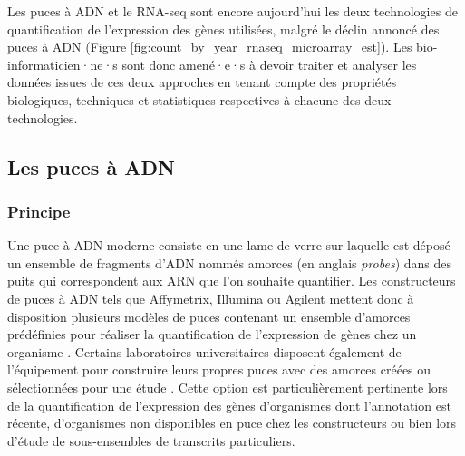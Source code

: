 Les puces à ADN et le RNA-seq sont encore aujourd'hui les deux technologies de quantification de l'expression des gènes utilisées, malgré le déclin annoncé des puces à ADN (Figure \ref{fig:count_by_year_rnaseq_microarray_est}). Les bio-informaticien·ne·s sont donc amené·e·s à devoir traiter et analyser les données issues de ces deux approches en tenant compte des propriétés biologiques, techniques et statistiques respectives à chacune des deux technologies.




\subsection{Les puces à ADN}

\subsubsection{Principe}


Une puce à ADN moderne consiste en une lame de verre sur laquelle est déposé un ensemble de fragments d'ADN nommés amorces (en anglais \textit{probes}) dans des puits qui correspondent aux ARN que l'on souhaite quantifier. Les constructeurs de puces à ADN tels que Affymetrix, Illumina ou Agilent mettent donc à disposition plusieurs modèles de puces contenant un ensemble d'amorces prédéfinies pour réaliser la quantification de l'expression de gènes chez un organisme \cite{Liu2010}. Certains laboratoires universitaires disposent également de l'équipement pour construire leurs propres puces avec des amorces créées ou sélectionnées pour une étude \cite{Thompson2001Apr}. Cette option est particulièrement pertinente lors de la quantification de l'expression des gènes d'organismes dont l'annotation est récente, d'organismes non disponibles en puce chez les constructeurs ou bien lors d'étude de sous-ensembles de transcrits particuliers.


